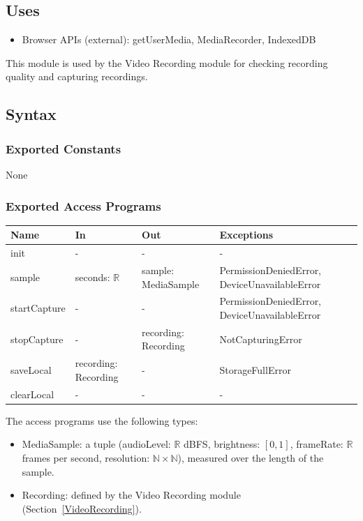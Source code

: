 \documentclass[12pt, titlepage]{article}
\begin{document}
\subsection{Uses}
\begin{itemize}
\item Browser APIs (external): getUserMedia, MediaRecorder, IndexedDB
\end{itemize}
This module is used by the Video Recording module for checking recording
quality and capturing recordings.

\subsection{Syntax}

\subsubsection{Exported Constants}
None

\subsubsection{Exported Access Programs}

\begin{center}
\begin{tabular}{p{3cm} p{3.5cm} p{3.5cm} p{4.5cm}}
\hline
\textbf{Name} & \textbf{In} & \textbf{Out} & \textbf{Exceptions} \\
\hline
init & - & - & - \\
sample & seconds: $\mathbb{R}$ & sample: MediaSample & PermissionDeniedError, DeviceUnavailableError \\
startCapture & - & - & PermissionDeniedError, DeviceUnavailableError \\
stopCapture & - & recording: Recording & NotCapturingError \\
saveLocal & recording: Recording & - & StorageFullError \\
clearLocal & - & - & - \\
\hline
\end{tabular}
\end{center}

\noindent The access programs use the following types:
\begin{itemize}
\item MediaSample: a tuple (audioLevel: $\mathbb{R}$ dBFS, brightness:
  $[0,1]$, frameRate: $\mathbb{R}$ frames per second, resolution:
  $\mathbb{N} \times \mathbb{N}$), measured over the length of the sample.
\item Recording: defined by the Video Recording module
  (Section~\ref{VideoRecording}).
\end{itemize}
\end{document}
